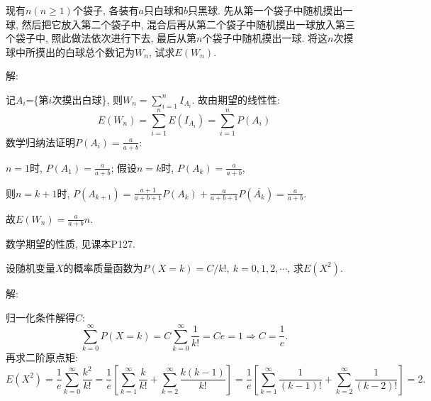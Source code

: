 \documentclass[standard]{ExBook}
\renewenvironment{shaded}{%
  \def\FrameCommand{\fboxsep=\FrameSep \colorbox{shadecolor}}%
  \MakeFramed{\advance\hsize-\width \FrameRestore}%
}{%
  \endMakeFramed
}
\begin{document}
\begin{qitems}
\vspace{2.5cm-5em}

    \begin{bbox}
    \begin{shaded}
        \qitem
现有$n(n\geq 1)$个袋子, 各装有$a$只白球和$b$只黑球. 先从第一个袋子中随机摸出一球, 然后把它放入第二个袋子中, 混合后再从第二个袋子中随机摸出一球放入第三个袋子中, 照此做法依次进行下去, 最后从第$n$个袋子中随机摸出一球. 将这$n$次摸球中所摸出的白球总个数记为$W_n$, 试求$E(W_n)$.
    \end{shaded}
    \end{bbox}

\vspace{\dimexpr2.5cm-5em\relax}

解: 

记$A_i$=\{第$i$次摸出白球\}, 则$W_n=\sum\limits_{i=1}^{n}I_{A_{i}}$. 故由期望的线性性:
$$E(W_n)=\sum\limits_{i=1}^{n}E(I_{A_i})=\sum\limits_{i=1}^{n}P(A_{i})$$
数学归纳法证明$P(A_i)=\frac{a}{a+b}$:

$n=1$时, $P(A_1)=\frac{a}{a+b}$; 假设$n=k$时, $P(A_k)=\frac{a}{a+b}$, 

则$n=k+1$时, $P(A_{k+1})=\frac{a+1}{a+b+1}P(A_k)+\frac{a}{a+b+1}P(\overline{A_k})=\frac{a}{a+b}$.

故$E(W_n)=\frac{a}{a+b}n$.

\textcolor{themeColor}{\selectfont {}
数学期望的性质, 见课本P127.}

\vspace{2.5cm-5em}

    \begin{bbox}
    \begin{shaded}
        \qitem
设随机变量$X$的概率质量函数为$P(X=k)=C/k!,\ k=0,1,2,\cdots$, 求$E(X^2)$.
    \end{shaded}
    \end{bbox}

\vspace{\dimexpr2.5cm-5em\relax}

解: 

归一化条件解得$C$:
$$
\sum\limits_{k=0}^{\infty}P(X=k)
=C\sum\limits_{k=0}^{\infty}\frac{1}{k!}
=Ce=1
\Longrightarrow C=\frac{1}{e}.
$$
再求二阶原点矩:
$$
E(X^2)
=\frac{1}{e}\sum\limits_{k=0}^{\infty}\frac{k^2}{k!}
=\frac{1}{e}\left[
\sum\limits_{k=1}^{\infty}\frac{k}{k!}
+\sum\limits_{k=2}^{\infty}\frac{k(k-1)}{k!}
\right]
=\frac{1}{e}\left[
\sum\limits_{k=1}^{\infty}\frac{1}{(k-1)!}
+\sum\limits_{k=2}^{\infty}\frac{1}{(k-2)!}
\right]
=2.
$$

\vspace{2.5cm-5em}


\end{qitems}
\end{document}
